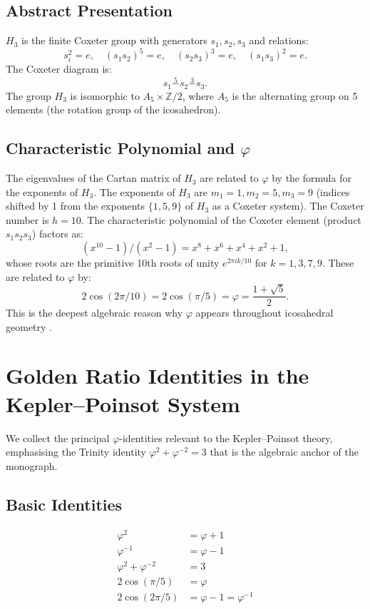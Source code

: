 \subsection{Abstract Presentation}
\label{ssec:h3-presentation}

$H_3$ is the finite Coxeter group with generators
$s_1, s_2, s_3$ and relations:
\[
  s_i^2 = e, \quad (s_1 s_2)^5 = e, \quad (s_2 s_3)^3 = e, \quad (s_1 s_3)^2 = e.
\]
The Coxeter diagram is:
\[
  s_1 \overset{5}{-} s_2 \overset{3}{-} s_3.
\]
The group $H_3$ is isomorphic to $A_5 \times \mathbb{Z}/2$,
where $A_5$ is the alternating group on 5 elements (the
rotation group of the icosahedron).

\subsection{Characteristic Polynomial and \texorpdfstring{$\varphi$}{φ}}
\label{ssec:h3-char-poly}

The eigenvalues of the Cartan matrix of $H_3$ are related to
$\varphi$ by the formula for the exponents of $H_3$.  The
exponents of $H_3$ are $m_1 = 1, m_2 = 5, m_3 = 9$
(indices shifted by 1 from the exponents $\{1,5,9\}$ of $H_3$
as a Coxeter system).  The Coxeter number is $h = 10$.  The
characteristic polynomial of the Coxeter element (product
$s_1 s_2 s_3$) factors as:
\[
  (x^{10} - 1)/(x^2 - 1) = x^8 + x^6 + x^4 + x^2 + 1,
\]
whose roots are the primitive 10th roots of unity
$e^{2\pi i k/10}$ for $k = 1, 3, 7, 9$.  These are related
to $\varphi$ by:
\[
  2\cos(2\pi/10) = 2\cos(\pi/5) = \varphi = \frac{1+\sqrt{5}}{2}.
\]
This is the deepest algebraic reason why $\varphi$ appears
throughout icosahedral geometry \cite{coxeter_regular_polytopes}.

\section{Golden Ratio Identities in the Kepler--Poinsot System}
\label{sec:phi-identities}

We collect the principal $\varphi$-identities relevant to the
Kepler–Poinsot theory, emphasising the Trinity identity
$\varphi^2 + \varphi^{-2} = 3$ that is the algebraic anchor
of the monograph.

\subsection{Basic Identities}
\label{ssec:phi-basic}

\begin{align}
  \varphi^2 &= \varphi + 1 \label{eq:phi-sq}\\
  \varphi^{-1} &= \varphi - 1 \label{eq:phi-inv}\\
  \varphi^2 + \varphi^{-2} &= 3 \label{eq:trinity-identity}\\
  2\cos(\pi/5) &= \varphi \label{eq:phi-cos}\\
  2\cos(2\pi/5) &= \varphi - 1 = \varphi^{-1} \label{eq:phi-inv-cos}
\end{align}

